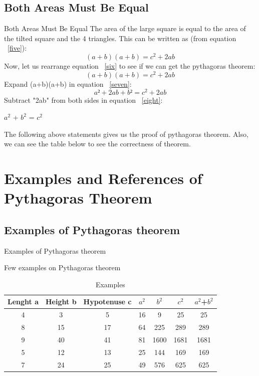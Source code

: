 \documentclass[10pt]{beamer}
\begin{document}
\subsection{Both Areas Must Be Equal}
\label{a_equal}
\begin{frame}{Both Areas Must Be Equal}
The area of the large square is equal to the area of the tilted square and the 4 triangles. This can be written as (from equation ~\ref{five}):\newline
\transfade
\begin{equation}
\label{six}
(a+b)(a+b) = c^2 +2ab
\end{equation}
Now, let us rearrange equation ~\ref{six} to see if we can get the pythagoras theorem:
\begin{equation}
\label{seven}
(a+b)(a+b)	=	c^2 + 2ab
\end{equation}
Expand (a+b)(a+b) in equation ~\ref{seven}:
\begin{equation}
\label{eight}
a² + 2ab + b²	=	c^2 + 2ab
\end{equation}
Subtract "2ab" from both sides in equation ~\ref{eight}:\newline	 
\centerline {$a^2$ + $b^2$	=	$c^2$}\newline

The following above statements gives us the proof of pythagoras theorem. Also, we can see the table below to see the correctness of theorem.
\end{frame}

\section{Examples and References of Pythagoras Theorem}
\subsection{Examples of Pythagoras theorem}
\begin{frame}{Examples of Pythagoras theorem}
\begin{exampleblock}{Few examples on Pythagoras theorem}
\begin{table}[bht]%
	\begin{center}
		\begin{tabular}{c c c c c c c}
			\hline\hline
			Lenght a & Height b & Hypotenuse c & $a^2$ & $b^2$ & $c^2$ & $a^2$+$b^2$    \\
			\hline
			\hline
			4 & 3 & 5 & 16 & 9 & 25 & 25 \\
			8 & 15 & 17 & 64 & 225 & 289 & 289\\
			9 & 40 & 41 & 81 & 1600 & 1681 & 1681\\
			5 & 12 & 13 & 25 & 144 & 169 & 169 \\
			7 & 24 & 25 & 49 & 576 & 625 & 625\\
			\hline
		\end{tabular}
		\caption{Examples}
		\label{sec:examp}
	\end{center}
\end{table}
\end{exampleblock}
\transblindshorizontal
\end{frame}
\end{document}
